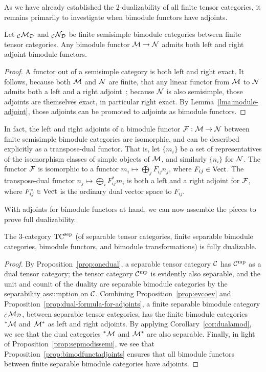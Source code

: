 \documentclass{amsart}
\begin{document}
As we have already established the 2-dualizability of all finite tensor categories, it remains primarily to investigate when bimodule functors have adjoints.
\begin{proposition} \label{prop:bimodfunctadjoints}
Let ${}_\mathcal C \mathcal M_\mathcal D$ and ${}_\mathcal C \mathcal N_\mathcal D$ be finite semisimple bimodule categories between finite tensor categories.  Any bimodule functor $\mathcal M \rightarrow \mathcal N$ admits both left and right adjoint bimodule functors.
\end{proposition}
\begin{proof}
A functor out of a semisimple category is both left and right exact.  It follows, because both $\mathcal M$ and $\mathcal N$ are finite, that any linear functor from $\mathcal M$ to $\mathcal N$ admits both a left and a right adjoint~\cite{BTP}; because $\mathcal N$ is also semisimple, those adjoints are themselves exact, in particular right exact.  By Lemma~\ref{lma:module-adjoint}, those adjoints can be promoted to adjoints as bimodule functors.
\end{proof}

\begin{remark}
In fact, the left and right adjoints of a bimodule functor $\mathcal F: \mathcal M \rightarrow \mathcal N$ between finite semisimple bimodule categories are isomorphic, and can be described explicitly as a transpose-dual functor.  That is, let $\{m_i\}$ be a set of representatives of the isomorphism classes of simple objects of $\mathcal M$, and similarly $\{n_i\}$ for $\mathcal N$.  The functor $\mathcal F$ is isomorphic to a functor $m_i \mapsto \bigoplus_j F_{ij} n_j$, where $F_{ij} \in \mathrm{Vect}$.  The transpose-dual functor $n_j \mapsto \bigoplus_i F_{ij}^* m_i$ is both a left and a right adjoint for $\mathcal F$, where $F_{ij}^* \in \mathrm{Vect}$ is the ordinary dual vector space to $F_{ij}$.
\end{remark}

With adjoints for bimodule functors at hand, we can now assemble the pieces to prove full dualizability.
\begin{theorem} \label{thm:TC-dualizable}
The 3-category ${\mathrm{TC}^{\mathrm{sep}}}$ (of separable tensor categories, finite separable bimodule categories, bimodule functors, and bimodule transformations) is fully dualizable.
\end{theorem}
\begin{proof}
By Proposition~\ref{prop:onedual}, a separable tensor category $\mathcal C$ has $\mathcal C^{\mathrm{mp}}$ as a dual tensor category; the tensor category $\mathcal C^{\mathrm{mp}}$ is evidently also separable, and the unit and counit of the duality are separable bimodule categories by the separability assumption on $\mathcal C$.  Combining Proposition~\ref{prop:evcoev} and Proposition~\ref{prop:dual-formula-for-adjoints}, a finite separable bimodule category ${}_\mathcal C \mathcal M_\mathcal D$, between separable tensor categories, has the finite bimodule categories ${}^* \mathcal M$ and $\mathcal M^*$ as left and right adjoints.  By applying Corollary~\ref{cor:dualamod}, we see that the dual categories ${}^* \mathcal M$ and $\mathcal M^*$ are also separable.  Finally, in light of Proposition~\ref{prop:sepmodissemi}, we see that Proposition~\ref{prop:bimodfunctadjoints} ensures that all bimodule functors between finite separable bimodule categories have adjoints.
\end{proof}
\end{document}
